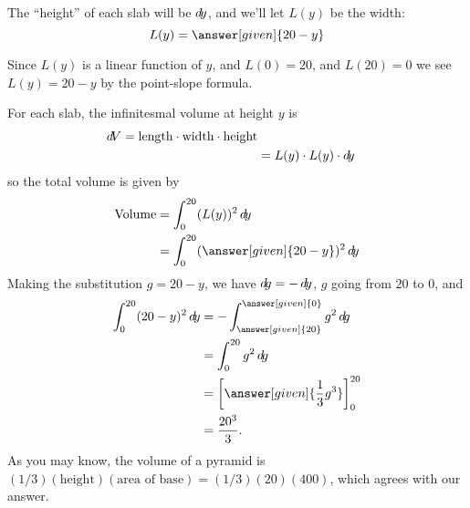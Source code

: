 \documentclass{ximera}
\begin{document}
\begin{example}
\begin{explanation}
\begin{image}
\end{image}
The ``height'' of each slab will be $\mathop{}\!d\! y$, and we'll let $L(y)$ be the width:
\[
L(y) = \answer[given]{20-y}
\]
\begin{hint}
  Since $L(y)$ is a linear function of $y$, and $L(0) = 20$, and
  $L(20) = 0$ we see $L(y) = 20-y$ by the point-slope formula.
\end{hint}
For each slab, the infinitesmal volume at height $y$ is
\begin{align*}
  \mathop{}\!d\! V = \mathrm{length} \cdot \mathrm{width}\cdot \mathrm{height}\\
&= L(y)\cdot L(y)\cdot  \mathop{}\!d\! y
\end{align*}
so the total volume is given by
\begin{align*}
  \mathrm{Volume} &= \int_0^{20} (L(y))^2 \d y \\
  &= \int_0^{20} (\answer[given]{20-y})^2 \d y
\end{align*}
Making the substitution $g = 20-y $, we have $\mathop{}\!d\! g = - \mathop{}\!d\! y$, $g$ going from $20$ to $0$, and 
	\begin{align*}
	\int_0^{20} (20-y)^2 \d y &= -\int_{\answer[given]{20}}^{\answer[given]{0}} g^2 \d g\\
		&= \int_0^{20} g^2 \d g\\
		&= \eval{\answer[given]{\frac{1}{3} g^3}}_0^{20}\\
		&= \frac{20^3}{3}.
	\end{align*}
As you may know, the volume of a pyramid is
$(1/3)(\text{height})(\text{area of base})=(1/3)(20)(400)$, which
agrees with our answer.
\end{explanation}
\end{example}
\end{document}
